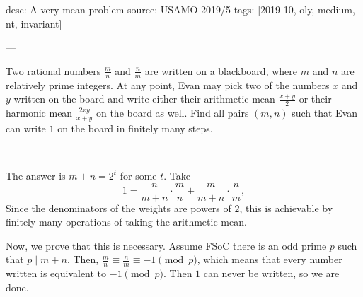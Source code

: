 desc: A very mean problem
source: USAMO 2019/5
tags: [2019-10, oly, medium, nt, invariant]

---

Two rational numbers $\tfrac mn$ and $\tfrac nm$ are written on a blackboard, where $m$ and $n$ are relatively prime integers. At any point, Evan may pick two of the numbers $x$ and $y$ written on the board and write either their arithmetic mean $\tfrac{x+y}2$ or their harmonic mean $\tfrac{2xy}{x+y}$ on the board as well. Find all pairs $(m,n)$ such that Evan can write $1$ on the board in finitely many steps.

---

The answer is $m+n=2^t$ for some $t$. Take \[1=\frac n{m+n}\cdot\frac mn+\frac m{m+n}\cdot\frac nm,\]
Since the denominators of the weights are powers of $2$, this is achievable by finitely many operations of taking the arithmetic mean.

Now, we prove that this is necessary. Assume FSoC there is an odd prime $p$ such that $p\mid m+n$. Then, $\tfrac mn\equiv\tfrac nm\equiv -1\pmod p$, which means that every number written is equivalent to $-1\pmod p$. Then $1$ can never be written, so we are done.

